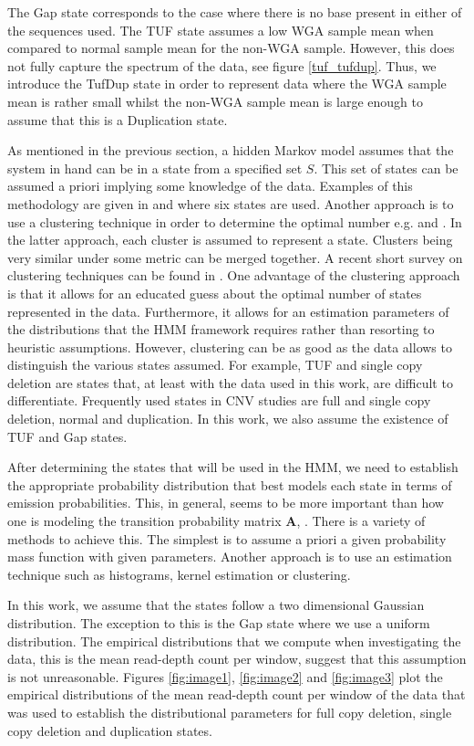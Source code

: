 \documentclass[12pt]{article}
\begin{document}
The Gap state  corresponds to the case where there is no base present in either of the sequences used. The TUF state assumes a low WGA sample mean when compared to normal sample mean for the non-WGA sample. However, this does not fully capture the spectrum of the data, see figure \ref{tuf_tufdup}.  Thus, we introduce the  TufDup state in order to represent data where the WGA sample mean is rather small whilst the non-WGA sample mean is large enough to assume that this is a Duplication state.

As mentioned in the previous section, a hidden Markov model assumes that the system in hand can be in a state from a specified set $S$. This set of states can be assumed a priori implying some knowledge of the data. Examples of this methodology are given in \cite{coella2007} and \cite{Wang2007}  where six states are used.  Another approach is to use a clustering technique in order to determine the optimal number e.g. \cite{fridlyand2004} and \cite{liu2017}. In the latter approach, each cluster is assumed to represent a state. Clusters being very similar under some metric can be merged together.  A recent short survey on clustering techniques can be found in \cite{2016Irani}. One advantage of the clustering approach is that it allows for an educated guess about the optimal number of states represented in the data. Furthermore, it allows for an estimation parameters of the distributions that the HMM framework requires rather than resorting to heuristic assumptions. However, clustering can be as good as the data allows to distinguish the various states assumed. For example, TUF and single copy deletion are states that, at least with the data used in this work, are difficult to differentiate. Frequently used states in CNV studies are full and single copy deletion, normal and duplication. In this work, we also assume the existence of TUF and  Gap states. 

After determining the states that will be used in the HMM,  we need to establish the appropriate probability distribution that best models each state in terms of emission probabilities. This, in general, seems to be more important than how one is modeling the transition probability matrix $\mathbf{A}$, \cite{rabiner2009}.  There is a variety of methods to achieve this. The simplest is to assume a priori a given probability mass function with given parameters. Another approach is to  use an estimation technique such as histograms, kernel estimation or clustering. 

In this work, we assume that the states follow a two dimensional Gaussian distribution. The exception to this is the Gap state where we use a uniform distribution. The empirical distributions that we compute when investigating the data, this is the mean read-depth count per window, suggest that this assumption  is not unreasonable. Figures  \ref{fig:image1}, \ref{fig:image2} and \ref{fig:image3} plot the empirical distributions of the mean read-depth count per window of the data that was used to establish the distributional parameters for full copy deletion, single copy deletion and duplication states. 
\end{document}
